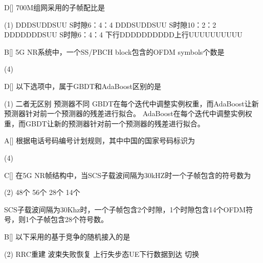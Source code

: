 \begin{choice}{D}[]
	700M组网采用的子帧配比是
	\begin{tasks}(1)
		\task DDDSUDDSUU S时隙6：4：4
		\task DDDSUDDSUU S时隙10：2：2
		\task DDDDDDDSUU S时隙6：4：4
		\task 下行DDDDDDDDDD上行UUUUUUUUUU
	\end{tasks}
\end{choice}


\begin{choice}{B}[]
	5G NR系统中，一个SS/PBCH block包含的OFDM symbols个数是
	\begin{tasks}(4)
	\end{tasks}
\end{choice}


\begin{choice}{D}[]
	以下选项中，属于GBDT和AdaBoost区别的是
	\begin{tasks}(1)
		\task 二者无区别
		\task 预测器不同
		\task GBDT在每个迭代中调整实例权重，而AdaBoost让新预测器针对前一个预测器的残差进行拟合。
		\task AdaBoost在每个迭代中调整实例权重，而GBDT让新的预测器针对前一个预测器的残差进行拟合。
	\end{tasks}
\end{choice}

\begin{choice}{A}[]
	根据电话号码编号计划规则，其中中国的国家号码标识为
	\begin{tasks}(4)
	\end{tasks}
\end{choice}

\begin{choice}{C}[]
	在5G NR帧结构中，当SCS子载波间隔为30kHZ时一个子帧包含的符号数为
	\begin{tasks}(2)
		\task 48个
		\task 56个
		\task 28个
		\task 14个
	\end{tasks}
\end{choice}
\begin{solution}
	SCS子载波间隔为30Khz时，一个子帧包含2个时隙，1个时隙包含14个OFDM符号，则1个子帧包含28个符号数。
\end{solution}


\begin{choice}{B}[]
	以下采用的基于竞争的随机接入的是
	\begin{tasks}(2)
		\task RRC重建
		\task 波束失败恢复
		\task 上行失步态UE下行数据到达
		\task 切换
	\end{tasks}
\end{choice}

